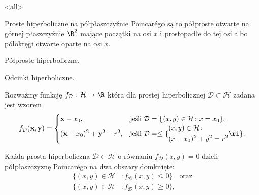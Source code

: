 \mode<all>{}
\begin{frame}
Proste hiperboliczne na półpłaszczyźnie Poincar\'{e}go są to półproste otwarte na górnej płaszczyźnie 
$\R^2$ mające początki na osi $x$ i prostopadłe do tej osi albo półokręgi otwarte oparte na osi $x$.

\begin{center}

Półproste hiperboliczne.
\end{center}

\end{frame}
\begin{frame}
\begin{center}

Odcinki hiperboliczne.
\end{center}
\end{frame}

\begin{frame}
\begin{definicja}
Rozważmy funkcję $f_\mathcal{D}:\,\mathcal H\to\R$ która dla prostej hiperbolicznej $\mathcal{D}\subset \mathcal{H}$ zadana jest wzorem\small
\[
f_\mathcal{D}(\mathbf{x,y})=
\begin{cases}
\mathbf{x}-x_{0}, &\text{jeśli }\mathcal{D}=\{(x,y)\in \mathcal{H}\colon x=x_{0}\},\\
(\mathbf{x}-x_{0})^{2}+\mathbf{y}^{2}-r^{2}, &\text{jeśli } \mathcal{D}=\le\{
\begin{aligned}
&(x,y)\in \mathcal{H}\colon\\
&(x-x_{0})^{2}+y^{2}=r^{2}
\end{aligned}\ri\}.
\end{cases}
\]
\end{definicja}\normalsize

\pause Każda prosta hiperboliczna $\mathcal{D}\subset \mathcal{H}$ o równaniu $f_\mathcal{D}(x,y)=0$
dzieli półpłaszczyznę Poincar\'{e}go na dwa obszary domknięte:
\begin{align*}
\{(x,y)\in \mathcal{H}&\colon  f_\mathcal{D}(x,y)\leqslant 0\} \quad \text{oraz}\\
\{(x,y)\in \mathcal{H}&\colon  f_\mathcal{D}(x,y)\geqslant 0\}, 
\end{align*}
 
\end{frame}
\begin{frame}[plain]
 
 \begin{center}
 
 \end{center}
 
 \end{frame}

